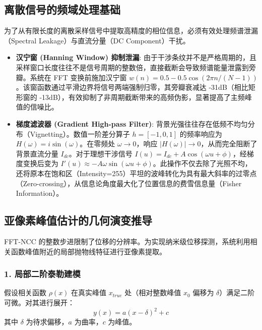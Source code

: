 \documentclass[twocolumn, a4paper, 10pt]{article}
\begin{document}
\subsection{离散信号的频域处理基础}
为了从有限长度的离散采样信号中提取高精度的相位信息，必须有效处理频谱泄漏（Spectral Leakage）与直流分量（DC Component）干扰。
\begin{itemize}
    \item \textbf{汉宁窗 (Hanning Window) 抑制泄漏}:
          由于干涉条纹并不是严格周期的，且采样窗口长度往往不是信号周期的整数倍，直接截断会导致频谱能量泄露到旁瓣。系统在 FFT 变换前施加汉宁窗 $w(n) = 0.5 - 0.5\cos(2\pi n / (N-1))$。该窗函数通过平滑边界将信号两端强制归零，其旁瓣衰减达 -31dB（相比矩形窗的 -13dB），有效抑制了非周期截断带来的高频伪影，显著提高了主频峰值的信噪比。

    \item \textbf{梯度滤波器 (Gradient High-pass Filter)}:
          背景光强往往存在低频不均匀分布（Vignetting）。数值一阶差分算子 $h = [-1, 0, 1]$ 的频率响应为 $H(\omega) = i \sin(\omega)$。在零频处 $\omega \to 0$，响应 $|H(\omega)| \to 0$，从而完全阻断了背景直流分量 $I_{dc}$。对于理想干涉信号 $I(u) = I_{dc} + A \cos(\omega u + \phi)$，经梯度变换后变为 $I'(u) \approx -A\omega \sin(\omega u + \phi)$。此操作不仅去除了光照不均，还将原本在饱和区（Intensity=255）平坦的波峰转化为具有最大斜率的过零点（Zero-crossing），从信息论角度最大化了位置信息的费雪信息量（Fisher Information）。
\end{itemize}



\subsection{亚像素峰值估计的几何演变推导}
FFT-NCC 的整数步进限制了位移的分辨率。为实现纳米级位移探测，系统利用相关函数峰值附近的局部抛物线特征进行亚像素提取。

\subsubsection{1. 局部二阶泰勒建模}
假设相关函数 $\rho(x)$ 在真实峰值 $x_{true}$ 处（相对整数峰值 $x_0$ 偏移为 $\delta$）满足二阶可微。对其进行展开：
\begin{equation}
    y(x) = a(x - \delta)^2 + c
\end{equation}
其中 $\delta$ 为待求偏移，$a$ 为曲率，$c$ 为峰值。
\end{document}

